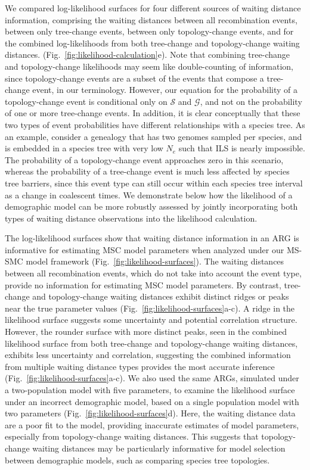 \documentclass[11pt]{article}
\begin{document}
We compared log-likelihood surfaces for four different sources of waiting
distance information, comprising the waiting distances between all 
recombination events, between only tree-change events, between only 
topology-change events, and for the combined log-likelihoods from both 
tree-change and topology-change waiting distances. 
(Fig.~\ref{fig:likelihood-calculation}e). 
Note that combining tree-change and topology-change likelihoods may seem 
like double-counting of information, since topology-change events are a
subset of the events that compose a tree-change event, in our terminology.
However, our equation for the probability of a topology-change event is 
conditional only on $\mathcal{S}$ and $\mathcal{G}$, and not on the probability 
of one or more tree-change events.
In addition, it is clear conceptually that these two types of event 
probabilities have different relationships with a species tree.
As an example, consider a genealogy that has two genomes sampled per species,
and is embedded in a species tree with very low $N_e$ such that ILS is nearly 
impossible. The probability of a topology-change event approaches zero
in this scenario, whereas the probability of a tree-change event is
much less affected by species tree barriers, since this event type can still 
occur within each species tree interval as a change in coalescent times.
We demonstrate below how the likelihood of a demographic model can be more
robustly assessed by jointly incorporating both types of waiting distance
observations into the likelihood calculation.


The log-likelihood surfaces show that waiting distance information
in an ARG is informative for estimating MSC model parameters when 
analyzed under our MS-SMC model framework
(Fig.~\ref{fig:likelihood-surfaces}). 
The waiting distances between all recombination events, which do not take into
account the event type, provide no information for estimating MSC model 
parameters. By contrast, tree-change and topology-change waiting distances 
exhibit distinct ridges or peaks near the true parameter values
(Fig.~\ref{fig:likelihood-surfaces}a-c).
A ridge in the likelihood surface suggests some uncertainty and potential
correlation structure. However, the rounder surface with more distinct peaks,
seen in the combined likelihood surface from both tree-change and 
topology-change waiting distances, exhibits less uncertainty and 
correlation, suggesting the combined information from multiple waiting distance
types provides the most accurate inference 
(Fig.~\ref{fig:likelihood-surfaces}a-c).
We also used the same ARGs, simulated under a two-population
model with five parameters, to examine the likelihood surface under an incorrect 
demographic model, based on a single population model with two parameters
(Fig.~\ref{fig:likelihood-surfaces}d). 
Here, the waiting distance data are a poor fit to the model, providing
inaccurate estimates of model parameters, especially from topology-change 
waiting distances. This suggests that topology-change waiting distances may be
particularly informative for model selection between demographic models, 
such as comparing species tree topologies.
\end{document}

